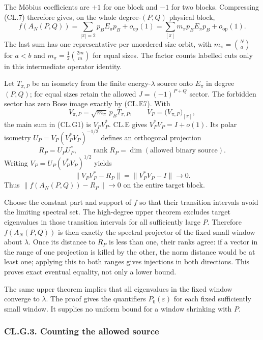 The Möbius coefficients are \(+1\) for one block and \(-1\) for two blocks. Compressing (CL.7) therefore gives, on the whole degree-\((P,Q)\) physical block, \[
f(A_N(P,Q))
=\sum_{|\pi|=2}p_BE_\pi p_B+o_{\mathrm{op}}(1)
=\sum_{[\pi]}m_\pi p_BE_\pi p_B+o_{\mathrm{op}}(1).
\tag{CL.G1}
\] The last sum has one representative per unordered size orbit, with \(m_\pi=\binom Na\) for \(a<b\) and \(m_\pi=\frac12\binom{2m}{m}\) for equal sizes. The factor counts labelled cuts only in this intermediate operator identity.

Let \(T_{\pi,P}\) be an isometry from the finite energy-\(\lambda\) source onto \(E_\pi\) in degree \((P,Q)\); for equal sizes retain the allowed \(J=(-1)^{P+Q}\) sector. The forbidden sector has zero Bose image exactly by (CL.E7). With \[
V_{\pi,P}=\sqrt{m_\pi}\,p_BT_{\pi,P},\qquad
V_P=\bigl(V_{\pi,P}\bigr)_{[\pi]},
\] the main sum in (CL.G1) is \(V_PV_P^*\). CL.E gives \(V_P^*V_P=I+o(1)\). Its polar isometry \(U_P=V_P(V_P^*V_P)^{-1/2}\) defines an orthogonal projection \[
R_P=U_PU_P^*,\qquad
\operatorname{rank}R_P=\dim(\text{allowed binary source}).
\tag{CL.G2}
\] Writing \(V_P=U_P(V_P^*V_P)^{1/2}\) yields \[
\|V_PV_P^*-R_P\|=\|V_P^*V_P-I\|\longrightarrow0.
\tag{CL.G3}
\] Thus \(\|f(A_N(P,Q))-R_P\|\to0\) on the entire target block.

Choose the constant part and support of \(f\) so that their transition intervals avoid the limiting spectral set. The high-degree upper theorem excludes target eigenvalues in those transition intervals for all sufficiently large \(P\). Therefore \(f(A_N(P,Q))\) is then exactly the spectral projector of the fixed small window about \(\lambda\). Once its distance to \(R_P\) is less than one, their ranks agree: if a vector in the range of one projection is killed by the other, the norm distance would be at least one; applying this to both ranges gives injections in both directions. This proves exact eventual equality, not only a lower bound.

The same upper theorem implies that all eigenvalues in the fixed window converge to \(\lambda\). The proof gives the quantifiers \(P_0(\varepsilon)\) for each fixed sufficiently small window. It supplies no uniform bound for a window shrinking with \(P\).

\hypertarget{cl.g.3.-counting-the-allowed-source}{%
\subsubsection{CL.G.3. Counting the allowed source}\label{cl.g.3.-counting-the-allowed-source}}

